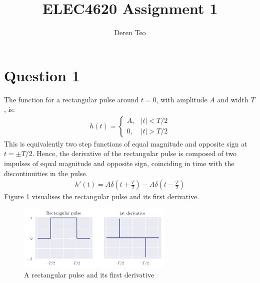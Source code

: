 \documentclass[a4paper, 11pt]{article}
\title{ELEC4620 Assignment 1}
\author{Deren Teo}
\begin{document}
\maketitle

\section*{Question 1}

The function for a rectangular pulse around $t=0$, with amplitude $A$ and width
$T$, is:
\begin{align*}
    h(t) = \begin{cases}
        A, & |t| < T/2 \\
        0, & |t| > T/2
    \end{cases}
\end{align*}
This is equivalently two step functions of equal magnitude and opposite sign at
$t=\pm T/2$. Hence, the derivative of the rectangular pulse is composed of two
impulses of equal magnitude and opposite sign, coinciding in time with the
discontinuities in the pulse.
\begin{align*}
    h'(t) = A \delta(t+\frac{T}{2}) - A \delta(t-\frac{T}{2})
\end{align*}
Figure \ref{fig:q1_rectangular} visualises the rectangular pulse and its first
derivative.

\begin{figure}[ht]
    \centering
    \includegraphics[width=0.66\textwidth]{images/q1_rectangular.png}
    \caption{A rectangular pulse and its first derivative}
    \label{fig:q1_rectangular}
\end{figure}
\end{document}
